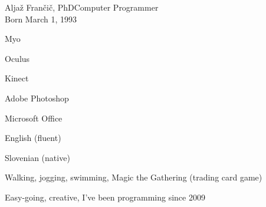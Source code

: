\documentclass{article}
\begin{document}
\begin{cv}[avatar]{Aljaž Frančič, PhD}{Computer Programmer\\\small{Born March 1, 1993}}
\begin{cvitem}
    Myo
\end{cvitem}

\begin{cvitem}
    Oculus
\end{cvitem}

\begin{cvitem}
    Kinect
\end{cvitem}

\begin{cvitem}
    Adobe Photoshop
\end{cvitem}

\begin{cvitem}
    Microsoft Office
\end{cvitem}


\begin{cvitem}
    English (fluent)
\end{cvitem}

\begin{cvitem}
    Slovenian (native)
\end{cvitem}

Walking, jogging, swimming, Magic the Gathering (trading card game)

Easy-going, creative, I’ve been programming since 2009

\end{cv}
\end{document}
